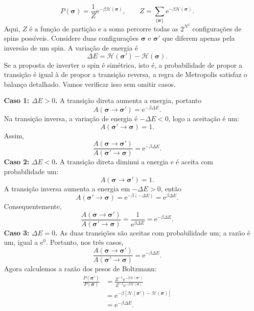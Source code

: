 \documentclass[12pt,a4paper]{article}
\newcommand{\e}[1]{\mathrm{e}^{#1}}
\begin{document}
%
\begin{equation}
    P(\bm\sigma)=\frac{1}{Z}\e{-\beta\mathcal H(\bm\sigma)},
    \qquad
    Z=\sum_{\{\bm\sigma\}}\e{-\beta\mathcal H(\bm\sigma)}.
    \label{eq:boltzmann}
\end{equation}
%
Aqui, $Z$ é a função de partição e a soma percorre todas as $2^{N^2}$ configurações de spins possíveis. Considere duas configurações $\bm\sigma$ e $\bm\sigma'$ que diferem apenas pela inversão de um spin. A variação de energia é
%
\[
    \Delta E=\mathcal H(\bm\sigma')-\mathcal H(\bm\sigma).
\]
%
Se a proposta de inverter o spin é simétrica, isto é, a probabilidade de propor a transição é igual à de propor a transição reversa, a regra de Metropolis satisfaz o balanço detalhado. Vamos verificar isso sem omitir casos.

\noindent\textbf{Caso 1: $\Delta E>0$.} A transição direta aumenta a energia, portanto
%
\[
    A(\bm\sigma\to\bm\sigma')=\e{-\beta\Delta E}.
\]
%
Na transição inversa, a variação de energia é $-\Delta E<0$, logo a aceitação é um:
%
\[
    A(\bm\sigma'\to\bm\sigma)=1.
\]
%
Assim,
%
\begin{equation}
    \frac{A(\bm\sigma\to\bm\sigma')}{A(\bm\sigma'\to\bm\sigma)}
    =\e{-\beta\Delta E}.
\end{equation}
%
\noindent\textbf{Caso 2: $\Delta E<0$.} A transição direta diminui a energia e é aceita com probabilidade um:
%
\[
    A(\bm\sigma\to\bm\sigma')=1.
\]
%
A transição inversa aumenta a energia em $-\Delta E>0$, então
%
\[
    A(\bm\sigma'\to\bm\sigma)=\e{-\beta(-\Delta E)}=\e{\beta\Delta E}.
\]
%
Consequentemente,
%
\begin{equation}
    \frac{A(\bm\sigma\to\bm\sigma')}{A(\bm\sigma'\to\bm\sigma)}
    =\frac{1}{\e{\beta\Delta E}}=\e{-\beta\Delta E}.
\end{equation}
%
\noindent\textbf{Caso 3: $\Delta E=0$.} As duas transições são aceitas com probabilidade um; a razão é um, igual a $\e0$. Portanto, nos três casos,
%
\begin{equation}
    \frac{A(\bm\sigma\to\bm\sigma')}{A(\bm\sigma'\to\bm\sigma)}
    =\e{-\beta\Delta E}.
    \label{eq:razao_aceitacao}
\end{equation}
%
Agora calculemos a razão dos pesos de Boltzmann:
%
\begin{align}
    \frac{P(\bm\sigma')}{P(\bm\sigma)}
    &=\frac{Z^{-1}\e{-\beta\mathcal H(\bm\sigma')}}
            {Z^{-1}\e{-\beta\mathcal H(\bm\sigma)}}\\
    &=\e{-\beta[\mathcal H(\bm\sigma')-\mathcal H(\bm\sigma)]}\\
    &=\e{-\beta\Delta E}.
    \label{eq:razao_boltzmann}
\end{align}
\end{document}
